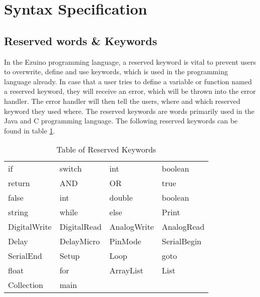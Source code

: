 \section{Syntax Specification}
\subsection{Reserved words \& Keywords}
In the Ezuino programming language, a reserved keyword is vital to prevent users to overwrite, define and use keywords, which is used in the programming language already. In case that a user tries to define a variable or function named a reserved keyword, they will receive an error, which will be thrown into the error handler. The error handler will then tell the users, where and which reserved keyword they used where. The reserved keywords are words primarily used in the Java and C programming language. The following reserved keywords can be found in table \ref{reservedKeywordsList}.

\begin{table}[h]
\centering
\begin{tabular}{llll}
if           & switch      & int         & boolean     \\
return       & AND         & OR          & true        \\
false        & int         & double      & boolean     \\
string       & while       & else        & Print       \\
DigitalWrite & DigitalRead & AnalogWrite & AnalogRead  \\
Delay        & DelayMicro  & PinMode     & SerialBegin \\
SerialEnd    & Setup       & Loop        & goto        \\
float        & for         & ArrayList   & List        \\
Collection   & main        &             &            
\end{tabular}
\caption{Table of Reserved Keywords}
\label{reservedKeywordsList}
\end{table}